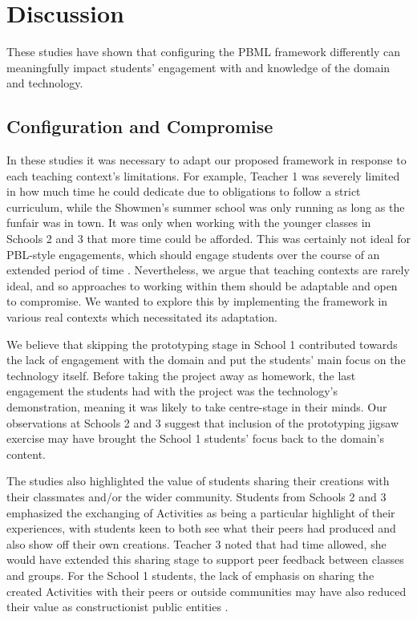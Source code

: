 \documentclass[,hyphens]{sigchi}
\begin{document}
\section{Discussion}
These studies have shown that configuring the PBML framework differently can meaningfully impact students' engagement with and knowledge of the domain and technology.

\subsection{Configuration and Compromise}
In these studies it was necessary to adapt our proposed framework in response to each teaching context's limitations. For example, Teacher 1 was severely limited in how much time he could dedicate due to obligations to follow a strict curriculum, while the Showmen's summer school was only running as long as the funfair was in town. It was only when working with the younger classes in Schools 2 and 3 that more time could be afforded. This was certainly not ideal for PBL-style engagements, which should engage students over the course of an extended period of time \cite{Blumenfeld1991}. Nevertheless, we argue that teaching contexts are rarely ideal, and so approaches to working within them should be adaptable and open to compromise. We wanted to explore this by implementing the framework in various real contexts which necessitated its adaptation.

We believe that skipping the prototyping stage in School 1 contributed towards the lack of engagement with the domain and put the students' main focus on the technology itself. Before taking the project away as homework, the last engagement the students had with the project was the technology's demonstration, meaning it was likely to take centre-stage in their minds. Our observations at Schools 2 and 3 suggest that inclusion of the prototyping jigsaw exercise may have brought the School 1 students' focus back to the domain's content.

The studies also highlighted the value of students sharing their creations with their classmates and/or the wider community. Students from Schools 2 and 3 emphasized the exchanging of Activities as being a particular highlight of their experiences, with students keen to both see what their peers had produced and also show off their own creations. Teacher 3 noted that had time allowed, she would have extended this sharing stage to support peer feedback between classes and groups. For the School 1 students, the lack of emphasis on sharing the created Activities with their peers or outside communities may have also reduced their value as constructionist public entities \cite{PapertSeymourandHarel1991a}.
\end{document}
